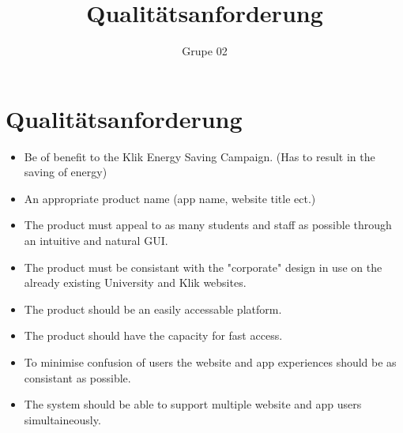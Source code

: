 \documentclass[10pt,a4paper]{article}
\author{Grupe 02}
\title{Qualitätsanforderung}
\begin{document}
\section*{Qualit{\"a}tsanforderung}
\begin{itemize}
\item
Be of benefit to the Klik Energy Saving Campaign. (Has to result in the saving of energy)
\item
An appropriate product name (app name, website title ect.)
\item
The product must appeal to as many students and staff as possible through an intuitive and natural GUI.
\item
The product must be consistant with the "corporate" design in use on the already existing University and Klik websites.
\item
The product should be an easily accessable platform.
\item
The product should have the capacity for fast access.
\item
To minimise confusion of users the website and app experiences should be as consistant as possible.
\item
The system should be able to support multiple website and app users simultaineously.
\end{itemize}
\end{document}
